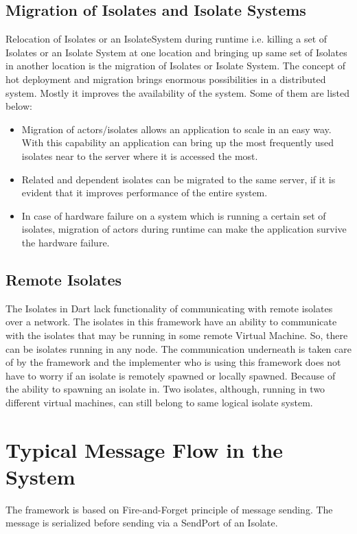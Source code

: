 \subsection{Migration of Isolates and Isolate Systems}
Relocation of Isolates or an IsolateSystem during runtime i.e. killing a set of Isolates or an Isolate System at one location and bringing up same set of Isolates in another location is the migration of Isolates or Isolate System. The concept of hot deployment and migration brings enormous possibilities in a distributed system. Mostly it improves the availability of the system. Some of them are listed below:
\begin{itemize}
  \item Migration of actors/isolates allows an application to scale in an easy way. With this capability an application can bring up the most frequently used isolates near to the server where it is accessed the most.
  \item Related and dependent isolates can be migrated to the same server, if it is evident that it improves performance of the entire system.
  \item In case of hardware failure on a system which is running a certain set of isolates, migration of actors during runtime can make the application survive the hardware failure.

\end{itemize}
\subsection{Remote Isolates}
The Isolates in Dart lack functionality of communicating with remote isolates over a network. The isolates in this framework have an ability to communicate with the isolates that may be running in some remote Virtual Machine. So, there can be isolates running in any node. The communication underneath is taken care of by the framework and the implementer who is using this framework does not have to worry if an isolate is remotely spawned or locally spawned.
Because of the ability to spawning an isolate in. Two isolates, although, running in two different virtual machines, can still belong to same logical isolate system.

\section{Typical Message Flow in the System}
The framework is based on Fire-and-Forget principle of message sending.
The message is serialized before sending via a SendPort of an Isolate.
